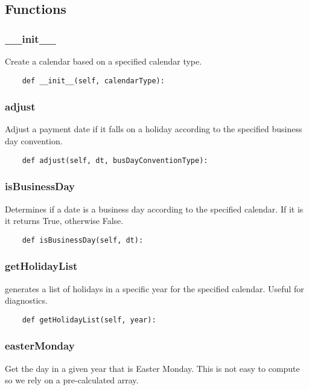 \documentclass[twoside,11pt]{book}
\begin{document}
\subsection*{Functions}

\subsubsection*{{\bf \_\_init\_\_}}
Create a calendar based on a specified calendar type.  

\begin{lstlisting}
    def __init__(self, calendarType):
\end{lstlisting}

\subsubsection*{{\bf adjust}}
Adjust a payment date if it falls on a holiday according to the specified business day convention.  

\begin{lstlisting}
    def adjust(self, dt, busDayConventionType):
\end{lstlisting}

\subsubsection*{{\bf isBusinessDay}}
Determines if a date is a business day according to the specified calendar. If it is it returns True, otherwise False.  

\begin{lstlisting}
    def isBusinessDay(self, dt):
\end{lstlisting}

\subsubsection*{{\bf getHolidayList}}
generates a list of holidays in a specific year for the specified calendar. Useful for diagnostics.  

\begin{lstlisting}
    def getHolidayList(self, year):
\end{lstlisting}

\subsubsection*{{\bf easterMonday}}
Get the day in a given year that is Easter Monday. This is not easy to compute so we rely on a pre-calculated array.  
\end{document}
